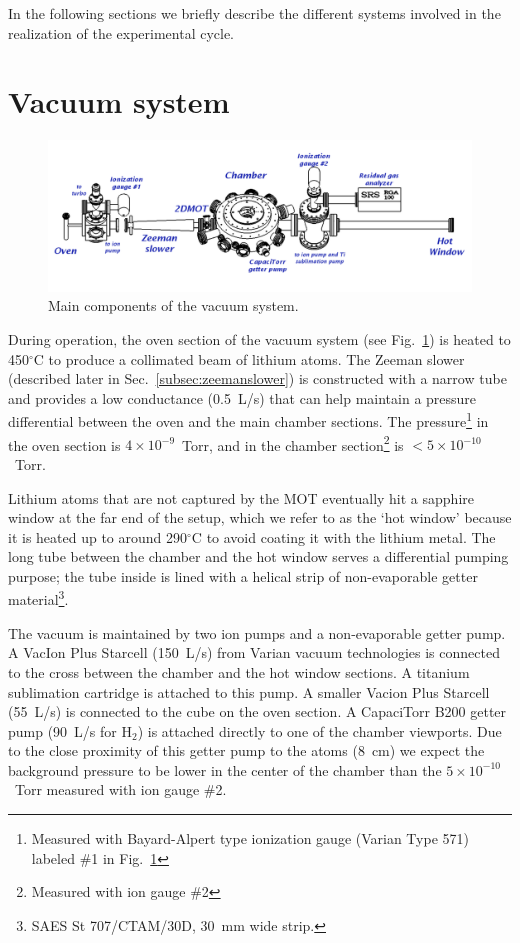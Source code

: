 In the following sections we briefly describe the different systems involved in
the realization of the experimental cycle. 


\section{Vacuum system}

\begin{figure}
\centering \includegraphics[width=\textwidth]{../masters-figures/vacuum/vacuum02.pdf}
\caption[Apparatus3 vacuum system]{\small Main components of the
vacuum system. } \label{fig:vacuum}
\end{figure}
During operation, the oven section of the vacuum system (see
Fig.~\ref{fig:vacuum}) is heated to 450$^{\circ}$C to produce a collimated beam
of lithium atoms.  The Zeeman slower (described later in
Sec.~\ref{subsec:zeemanslower}) is constructed with a narrow tube and provides
a low conductance (0.5~L/s) that can help maintain 
a pressure differential between the oven and the main chamber sections.  The
pressure\footnote{Measured with Bayard-Alpert type ionization gauge (Varian
Type 571) labeled \#1 in Fig.~\ref{fig:vacuum}} in the oven section is $4\times
10^{-9}$~Torr, and in the chamber section\footnote{Measured with ion gauge \#2}
is $<5\times10^{-10}$~Torr.   

Lithium atoms that are not captured by the MOT eventually hit a sapphire window
at the far end of the setup, which we refer to as the `hot window' because it
is heated up to around 290$^{\circ}$C to avoid coating it with the lithium
metal.  The long tube between the chamber and the hot window serves a
differential pumping purpose; the tube inside is lined with a helical strip of
non-evaporable getter material\footnote{SAES St 707/CTAM/30D, 30~mm wide
strip.}.

The vacuum is maintained by two ion pumps and a non-evaporable getter pump.  A
VacIon Plus Starcell (150~L/s) from Varian vacuum technologies is connected to
the cross between the chamber and the hot window sections.   A titanium
sublimation cartridge is attached to this pump.  A
smaller Vacion Plus Starcell (55~L/s) is connected to the cube on the oven
section.  A CapaciTorr B200 getter pump (90~L/s for H$_{2}$) is attached
directly to one of the chamber viewports.   Due to the close proximity of this
getter pump to the atoms (8~cm) we expect the background pressure to be lower
in the center of the chamber than the $5\times10^{-10}$~Torr measured with ion
gauge \#2.



